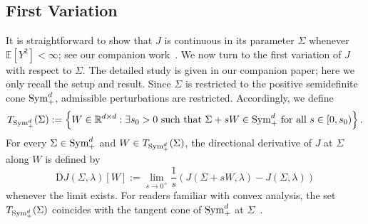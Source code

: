\documentclass[sn-mathphys-num]{sn-jnl}%
\numberwithin{equation}{section}
\newcommand{\R}{\mathbb{R}}
\newcommand{\E}{\mathbb{E}}
\renewcommand{\P}{\mathbb{P}}
\newtheorem{lemma}{Lemma}
\newcommand{\Sym}{{\rm \mathrm{Sym}}}
\theoremstyle{thmstyleone}%
\theoremstyle{thmstyletwo}%
\theoremstyle{thmstylethree}%
\begin{document}


%
%


\subsection{First Variation} 
\label{sec:first-variation}
\indent\indent 
It is straightforward to show that $J$ is continuous in its parameter $\Sigma$
whenever $\E[Y^2] < \infty$; see our companion work~\cite[Proposition 2.8]{LiRu25}.
We now turn to the first variation of $J$ with respect to $\Sigma$.
The detailed study is given in our companion paper; here we only recall 
the setup and result.
Since $\Sigma$ is restricted to the positive semidefinite cone $\Sym_+^d$,
admissible perturbations are restricted. Accordingly, we define 
\begin{equation*}
	T_{\Sym_+^d}(\Sigma) := \left\{W \in \R^{d \times d}: \exists s_0 > 0~\text{such that}~\Sigma + s W \in \Sym_+^d~\text{for all}~s \in [0, s_0)\right\}.
\end{equation*}
For every $\Sigma \in \Sym_+^d$ and $W \in T_{\Sym_+^d}(\Sigma)$, the directional 
derivative of $J$ at $\Sigma$ along $W$ is defined by 
\begin{equation*}
\mathrm{D} J(\Sigma, \lambda)[W] := \lim_{s \to 0^+} \frac{1}{s} \left( J(\Sigma + s W, \lambda) - J(\Sigma, \lambda) \right)
\end{equation*}
whenever the limit exists. For readers familiar with convex analysis, the set $T_{\Sym_+^d}(\Sigma)$ coincides with
the tangent cone of $\Sym_+^d$ at $\Sigma$~\cite{RockafellarTyWe98}. %
\end{document}
